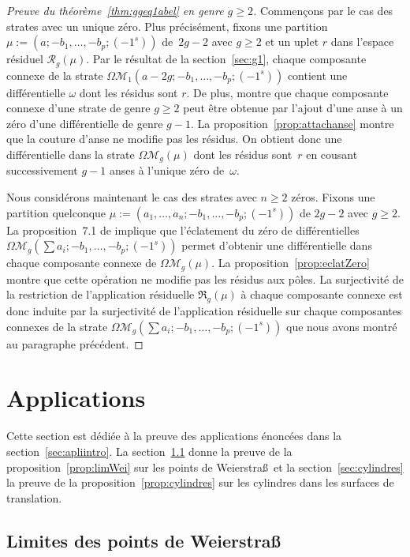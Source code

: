 \documentclass[JEP,XML,SOM,Unicode,francais,NoFloatCountersInSection,published]{cedram}
\let\mathcal\mathscr
\newcommand{\appres}[1][g]{\mathfrak{R}_{#1}}
\newcommand{\espres}[1][g]{\mathcal{R}_{#1}}
\newcommand{\omoduli}[1][g]{{\Omega\mathcal M}_{\!#1}}
\theoremstyle{definition}
\begin{document}
\begin{proof}[Preuve du théorème~\ref{thm:ggeq1abel} en genre $g\geq2$]
Commençons par le cas des strates avec un unique zéro. Plus précisément, fixons une partition $\mu:=(a;-b_{1},\dots,-b_{p};(-1^{s}))$ de~$2g-2$ avec $g\geq2$ et un uplet $r$ dans l'espace résiduel $\espres(\mu)$. Par le résultat de la section~\ref{sec:g1}, chaque composante connexe de la strate $\omoduli[1](a-2g;-b_{1},\dots,-b_{p};(-1^{s}))$ contient une différentielle $\omega$ dont les résidus sont $r$. De plus, \cite[Prop.\,6.1]{Bo} montre que chaque composante connexe d'une strate de genre $g \geq 2$ peut être obtenue par l'ajout d'une anse à un zéro d'une différentielle de genre $g-1$. La proposition~\ref{prop:attachanse} montre que la couture d'anse ne modifie pas les résidus. On obtient donc une différentielle dans la strate $\omoduli[g](\mu)$ dont les résidus sont~$r$ en cousant successivement $g-1$ anses à l'unique zéro de~$\omega$.

Nous considérons maintenant le cas des strates avec $n\geq 2$ zéros. Fixons une partition quelconque $\mu:=(a_{1},\ldots,a_{n};-b_{1},\dots,-b_{p};(-1^{s}))$ de $2g-2$ avec $g\geq2$.
La proposition~7.1 de \cite{Bo} implique que l'éclatement du zéro de différentielles $\omoduli[g](\sum a_{i};-b_{1},\dots,-b_{p};(-1^{s}))$ permet d'obtenir une différentielle dans chaque composante connexe de $\omoduli(\mu)$. La proposition~\ref{prop:eclatZero} montre que cette opération ne modifie pas les résidus aux pôles. La surjectivité de la restriction de l'application résiduelle $\appres(\mu)$ à chaque composante connexe est donc induite par la surjectivité de l'application résiduelle sur chaque composantes connexes de la strate $\omoduli[g](\sum a_{i};-b_{1},\dots,-b_{p};(-1^{s}))$ que nous avons montré au paragraphe précédent.
\end{proof}

\section{Applications}
\label{sec:appli}

Cette section est dédiée à la preuve des applications énoncées dans la section~\ref{sec:apliintro}. La section~\ref{sec:limwei} donne la preuve de la proposition~\ref{prop:limWei} sur les points de Weierstra\ss~et la section~\ref{sec:cylindres} la preuve de la proposition~\ref{prop:cylindres} sur les cylindres dans les surfaces de translation.

\subsection{Limites des points de Weierstra{\normalfont\ss}}
\label{sec:limwei}
\end{document}
